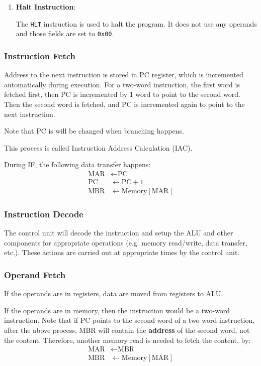 \begin{enumerate}
\item \textbf{Halt Instruction}:

The \texttt{HLT} instruction is used to halt the program. It does not use any operands
and those fields are set to \texttt{0x00}.

\end{enumerate}

\subsubsection{Instruction Fetch}

Address to the next instruction is stored in PC register, which is incremented automatically
during execution. For a two-word instruction, the first word is fetched first, then PC
is incremented by 1 word to point to the second word. Then the second word is fetched,
and PC is incremented again to point to the next instruction.

Note that PC is will be changed when branching happens.

This process is called Instruction Address Calculation (IAC).

During IF, the following data transfer happens:
\begin{align*}
    \text{MAR} &\leftarrow \text{PC} \\
    \text{PC} &\leftarrow \text{PC} + 1 \\
    \text{MBR} &\leftarrow \text{Memory}[\text{MAR}]
\end{align*}

\subsubsection{Instruction Decode}

The control unit will decode the instruction and setup the ALU and other components
for appropriate operations (e.g. memory read/write, data transfer, etc.). These actions
are carried out at appropriate times by the control unit.

\subsubsection{Operand Fetch}

If the operands are in registers, data are moved from registers to ALU.

If the operands are in memory, then the instruction would be a two-word instruction.
Note that if PC points to the second word of a two-word instruction, after the above process,
MBR will contain the \textbf{address} of the second word, not the content. Therefore, another
memory read is needed to fetch the content, by:
\begin{align*}
    \text{MAR} &\leftarrow \text{MBR} \\
    \text{MBR} &\leftarrow \text{Memory}[\text{MAR}]
\end{align*}


